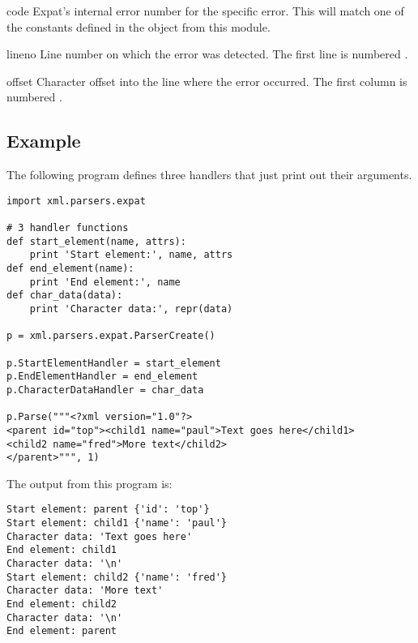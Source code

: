 \begin{memberdesc}[ExpatError]{code}
  Expat's internal error number for the specific error.  This will
  match one of the constants defined in the  object from
  this module.
\end{memberdesc}

\begin{memberdesc}[ExpatError]{lineno}
  Line number on which the error was detected.  The first line is
  numbered .
\end{memberdesc}

\begin{memberdesc}[ExpatError]{offset}
  Character offset into the line where the error occurred.  The first
  column is numbered .
\end{memberdesc}


\subsection{Example \label{expat-example}}

The following program defines three handlers that just print out their
arguments.

\begin{verbatim}
import xml.parsers.expat

# 3 handler functions
def start_element(name, attrs):
    print 'Start element:', name, attrs
def end_element(name):
    print 'End element:', name
def char_data(data):
    print 'Character data:', repr(data)

p = xml.parsers.expat.ParserCreate()

p.StartElementHandler = start_element
p.EndElementHandler = end_element
p.CharacterDataHandler = char_data

p.Parse("""<?xml version="1.0"?>
<parent id="top"><child1 name="paul">Text goes here</child1>
<child2 name="fred">More text</child2>
</parent>""", 1)
\end{verbatim}

The output from this program is:

\begin{verbatim}
Start element: parent {'id': 'top'}
Start element: child1 {'name': 'paul'}
Character data: 'Text goes here'
End element: child1
Character data: '\n'
Start element: child2 {'name': 'fred'}
Character data: 'More text'
End element: child2
Character data: '\n'
End element: parent
\end{verbatim}


